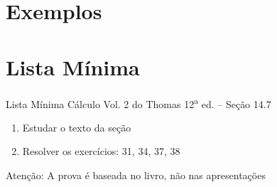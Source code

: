 \section{Exemplos}




\section{Lista Mínima}

\begin{frame}{Lista Mínima}
  Cálculo Vol. 2 do Thomas 12\textsuperscript{a} ed. -- Seção 14.7
  \begin{enumerate}
    \item Estudar o texto da seção
    \item Resolver os exercícios: 31, 34, 37, 38
  \end{enumerate}

  \vfill
  Atenção: A prova é baseada no livro, não nas apresentações
\end{frame}


